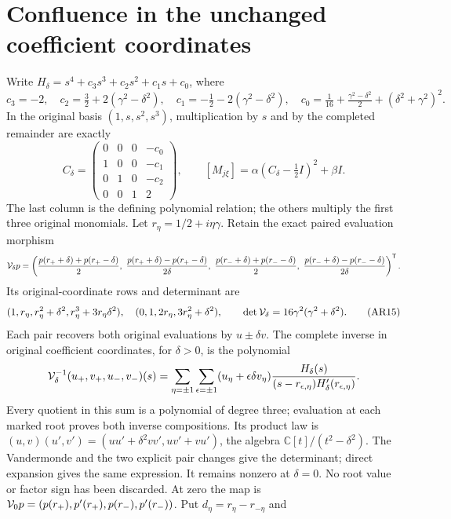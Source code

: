 \documentclass[11pt]{article}
\newcommand{\C}{\mathbb C}
\begin{document}
\section{Confluence in the unchanged coefficient coordinates}
Write $H_\delta=s^4+c_3s^3+c_2s^2+c_1s+c_0$, where
\[
c_3=-2,\quad c_2=\tfrac32+2(\gamma^2-\delta^2),\quad
c_1=-\tfrac12-2(\gamma^2-\delta^2),\quad
c_0=\tfrac1{16}+\tfrac{\gamma^2-\delta^2}{2}
                              +(\delta^2+\gamma^2)^2.
\]
In the original basis $(1,s,s^2,s^3)$, multiplication by
$s$ and by the completed remainder are exactly
\begin{equation}
C_\delta=\begin{pmatrix}
0&0&0&-c_0\\1&0&0&-c_1\\0&1&0&-c_2\\0&0&1&2
\end{pmatrix},\qquad
[M_{j\xi}]=\alpha(C_\delta-\tfrac12I)^2+\beta I .
\tag{AR14}
\end{equation}
The last column is the defining polynomial relation; the
others multiply the first three original monomials.
Let $r_\eta=1/2+i\eta\gamma$. Retain the exact paired
evaluation morphism
\[
{\cal V}_\delta p=
\left(\frac{p(r_++\delta)+p(r_+-\delta)}2,\
\frac{p(r_++\delta)-p(r_+-\delta)}{2\delta},\
\frac{p(r_-+\delta)+p(r_--\delta)}2,\
\frac{p(r_-+\delta)-p(r_--\delta)}{2\delta}\right)^{\mathsf T}.
\]
Its original-coordinate rows and determinant are
\begin{equation}
(1,r_\eta,r_\eta^2+\delta^2,r_\eta^3+3r_\eta\delta^2),\quad
(0,1,2r_\eta,3r_\eta^2+\delta^2),\qquad
\det{\cal V}_\delta=16\gamma^2(\gamma^2+\delta^2).
\tag{AR15}
\end{equation}
Each pair recovers both original evaluations by $u\pm\delta v$.
The complete inverse in original coefficient coordinates, for
$\delta>0$, is the polynomial
\[
{\cal V}_\delta^{-1}(u_+,v_+,u_-,v_-)(s)
=\sum_{\eta=\pm1}\sum_{\epsilon=\pm1}
(u_\eta+\epsilon\delta v_\eta)
\frac{H_\delta(s)}
 {(s-r_{\epsilon,\eta})H'_\delta(r_{\epsilon,\eta})}.
\]
Every quotient in this sum is a polynomial of degree three;
evaluation at each marked root proves both inverse compositions.
Its product law is $(u,v)(u',v')=(uu'+\delta^2vv',uv'+vu')$,
the algebra $\C[t]/(t^2-\delta^2)$. The Vandermonde and the
two explicit pair changes give the determinant; direct
expansion gives the same expression. It remains nonzero
at $\delta=0$. No root value or factor sign has been discarded.
At zero the map is
$ {\cal V}_0p=(p(r_+),p'(r_+),p(r_-),p'(r_-))$.
Put $d_\eta=r_\eta-r_{-\eta}$ and
\end{document}
